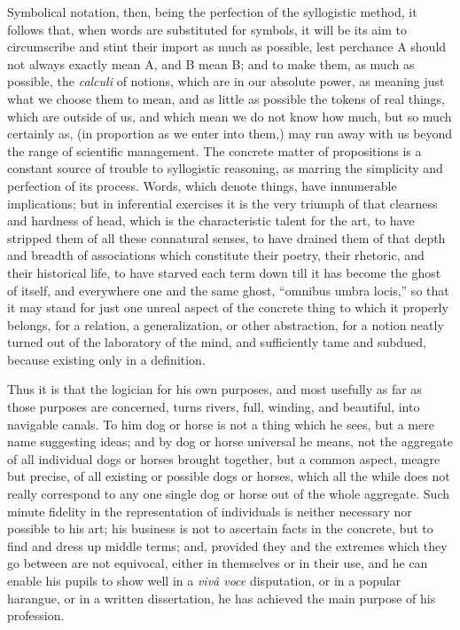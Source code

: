 Symbolical notation, then, being the perfection of the syllogistic
method, it follows that, when words are substituted for symbols, it
will be its aim to circumscribe and stint their import as much as
possible, lest perchance A should not always exactly mean A, and B
mean B; and to make them, as much as possible, the \emph{calculi} of
notions, which are in our absolute power, as meaning just what we
choose them to mean, and as little as possible the tokens of real
things, which are outside of us, and which mean we do not know how
much, but so much certainly as, (in proportion as we enter into
them,) may run away with us beyond the range of scientific management.
The concrete matter of propositions is a constant source of trouble to
syllogistic reasoning, as marring the simplicity and perfection of its
process. Words, which denote things, have innumerable implications;
but in inferential exercises it is the very triumph of that clearness
and hardness of head, which is the characteristic talent for the art,
to have stripped them of all these connatural senses, to have drained
them of that depth and breadth of associations which constitute their
poetry, their rhetoric, and their historical life, to have starved
each term down till it has become the ghost of itself, and everywhere
one and the same ghost, ``omnibus umbra locis,'' so that it
may stand for just one unreal aspect of the concrete thing to which it
properly belongs, for a relation, a generalization, or other
abstraction, for a notion neatly turned out of the laboratory of the
mind, and sufficiently tame and subdued, because existing only in a
definition.

Thus it is that the logician for his own purposes, and most
usefully as far as those purposes are concerned, turns rivers, full,
winding, and beautiful, into navigable canals. To him dog or horse is
not a thing which he sees, but a mere name suggesting ideas; and by
dog or horse universal he means, not the aggregate of all individual
dogs or horses brought together, but a common aspect, meagre but
precise, of all existing or possible dogs or horses, which all the
while does not really correspond to any one single dog or horse out of
the whole aggregate. Such minute fidelity in the representation of individuals is neither necessary nor possible to his art; his
business is not to ascertain facts in the concrete, but to find and
dress up middle terms; and, provided they and the extremes which they
go between are not equivocal, either in themselves or in their use,
and he can enable his pupils to show well in a \emph{vivâ voce}
disputation, or in a popular harangue, or in a written dissertation,
he has achieved the main purpose of his profession.

